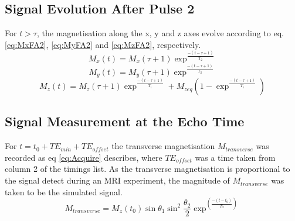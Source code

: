 \documentclass[journal]{IEEEtran}
\begin{document}
\subsection{Signal Evolution After Pulse 2}
For $t > \tau$, the magnetisation along the x, y and z axes evolve according to eq. \ref{eq:MxFA2}, \ref{eq:MyFA2} and \ref{eq:MzFA2}, respectively.
\begin{equation}  \label{eq:MxFA2}
M_{x}(t) = M_{x}(\tau + 1)\exp^{\frac{-(t-\tau +1) }{T_{2}} }
\end{equation}
\begin{equation}  \label{eq:MyFA2}
M_{y}(t) = M_{y}(\tau + 1)\exp^{\frac{-(t-\tau +1) }{T_{2}} }
\end{equation}
\begin{equation} \label{eq:MzFA2}
M_{z}(t) = M_{z}(\tau + 1)\exp^{\frac{-(t-\tau+1)}{T_{1}}} + M_{zeq}(1-\exp^{\frac{-(t-\tau + 1)}{T_{1}}})
\end{equation}
\subsection{Signal Measurement at the Echo Time}
For $t = t_0 + TE_{min} + TE_{offset}$ the transverse magnetisation $M_{transverse}$ was recorded as eq \ref{eq:Acquire}
describes, where $TE_{offset}$ was a time taken from column 2 of the timings list. As the transverse magnetisation is proportional to the signal detect during an MRI experiment, the magnitude of $M_{transverse}$ was taken to be the simulated signal.
\begin{equation} \label{eq:Acquire}
M_{transverse} = M_{z}(t_{0})\sin{\theta_{1}}\sin^2{\frac{\theta_{2}}{2}}\exp^(\frac{-(t-t_{0})}{T_{2}})
\end{equation}

\end{document}

